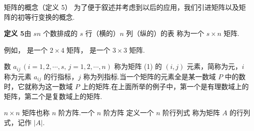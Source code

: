 \begin{fdeep}{矩阵的概念（定义 5）}
为了便于叙述并考虑到以后的应用，我们引进矩阵以及矩阵的初等行变换的概念.

\textbf{定义 5}\quad 由 $sn$ 个数排成的 $s$ 行（横的）$n$ 列（纵的）的表
称为一个 $s\times n$ 矩阵.

例如，
是一个 $2\times4$ 矩阵，
是一个 $3\times3$ 矩阵.

数 $a_{ij}\,(i=1,2,\cdots,s,\,j=1,2,\cdots,n)$ 称为矩阵 (1) 的 $(i,j)$ 元素，简称为元，$i$ 称为元素 $a_{ij}$ 的行指标，$j$ 称为列指标.当一个矩阵的元素全是某一数域 $P$ 中的数时，它就称为这一数域 $P$ 上的矩阵.在上面所举的例子中，第一个是有理数域上的矩阵，第二个是复数域上的矩阵.

$n\times n$ 矩阵也称 $n$ 阶方阵.一个 $n$ 阶方阵
定义一个 $n$ 阶行列式
称为矩阵 $A$ 的行列式，记作 $|A|$.
\end{fdeep}


